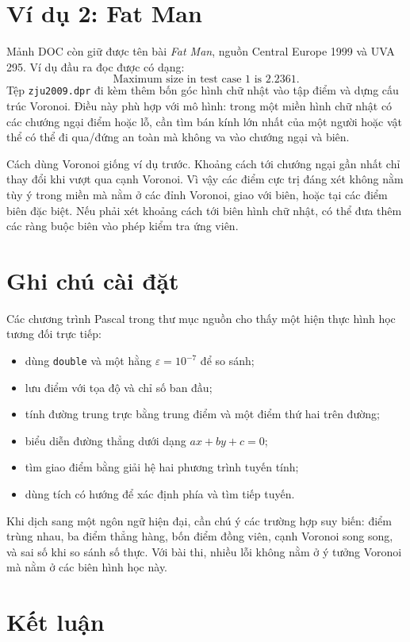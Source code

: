 \documentclass[11pt]{article}
\begin{document}
\section{Ví dụ 2: Fat Man}

Mảnh DOC còn giữ được tên bài \textit{Fat Man}, nguồn Central Europe 1999 và
UVA 295. Ví dụ đầu ra đọc được có dạng:
\[
  \text{Maximum size in test case 1 is }2.2361.
\]
Tệp \texttt{zju2009.dpr} đi kèm thêm bốn góc hình chữ nhật vào tập điểm và
dựng cấu trúc Voronoi. Điều này phù hợp với mô hình: trong một miền hình chữ
nhật có các chướng ngại điểm hoặc lỗ, cần tìm bán kính lớn nhất của một người
hoặc vật thể có thể đi qua/đứng an toàn mà không va vào chướng ngại và biên.

Cách dùng Voronoi giống ví dụ trước. Khoảng cách tới chướng ngại gần nhất chỉ
thay đổi khi vượt qua cạnh Voronoi. Vì vậy các điểm cực trị đáng xét không
nằm tùy ý trong miền mà nằm ở các đỉnh Voronoi, giao với biên, hoặc tại các
điểm biên đặc biệt. Nếu phải xét khoảng cách tới biên hình chữ nhật, có thể
đưa thêm các ràng buộc biên vào phép kiểm tra ứng viên.

\section{Ghi chú cài đặt}

Các chương trình Pascal trong thư mục nguồn cho thấy một hiện thực hình học
tương đối trực tiếp:
\begin{itemize}
  \item dùng \texttt{double} và một hằng \(\varepsilon=10^{-7}\) để so sánh;
  \item lưu điểm với tọa độ và chỉ số ban đầu;
  \item tính đường trung trực bằng trung điểm và một điểm thứ hai trên đường;
  \item biểu diễn đường thẳng dưới dạng \(ax+by+c=0\);
  \item tìm giao điểm bằng giải hệ hai phương trình tuyến tính;
  \item dùng tích có hướng để xác định phía và tìm tiếp tuyến.
\end{itemize}

Khi dịch sang một ngôn ngữ hiện đại, cần chú ý các trường hợp suy biến:
điểm trùng nhau, ba điểm thẳng hàng, bốn điểm đồng viên, cạnh Voronoi song
song, và sai số khi so sánh số thực. Với bài thi, nhiều lỗi không nằm ở ý
tưởng Voronoi mà nằm ở các biên hình học này.

\section{Kết luận}
\end{document}
